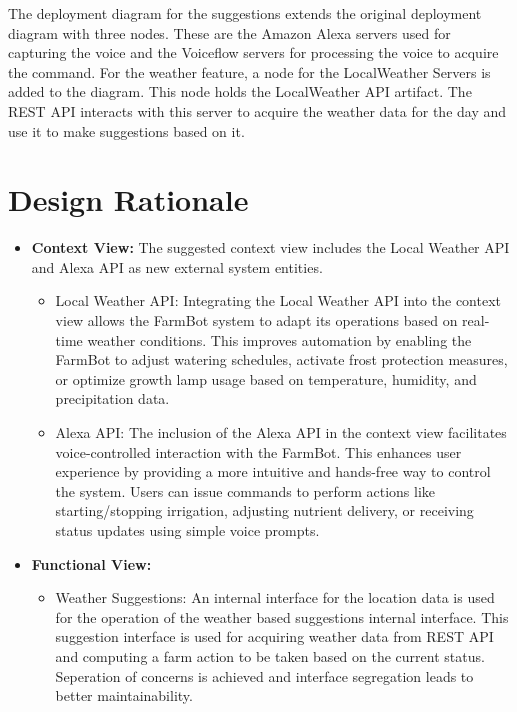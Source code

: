The deployment diagram for the suggestions extends the original deployment diagram with three nodes. These are the Amazon Alexa servers used for capturing the voice and the Voiceflow servers for processing the voice to acquire the command. For the weather feature, a node for the LocalWeather Servers is added to the diagram. This node holds the LocalWeather API artifact. The REST API interacts with this server to acquire the weather data for the day and use it to make suggestions based on it. 

\section{Design Rationale}
\begin{itemize}
    \item \textbf{Context View:} The suggested context view includes the Local Weather API and Alexa API as new external system entities.
          \begin{itemize}
              \item Local Weather API: Integrating the Local Weather API into the context view allows the FarmBot system to adapt its operations based on real-time weather conditions. This improves automation by enabling the FarmBot to adjust watering schedules, activate frost protection measures, or optimize growth lamp usage based on temperature, humidity, and precipitation data.
              \item Alexa API: The inclusion of the Alexa API in the context view facilitates voice-controlled interaction with the FarmBot. This enhances user experience by providing a more intuitive and hands-free way to control the system. Users can issue commands to perform actions like starting/stopping irrigation, adjusting nutrient delivery, or receiving status updates using simple voice prompts.
          \end{itemize}
    \item \textbf{Functional View:} \begin{itemize}
        \item Weather Suggestions: An internal interface for the location data is used for the operation of the weather based suggestions internal interface. This suggestion interface is used for acquiring weather data from REST API and computing a farm action to be taken based on the current status. Seperation of concerns is achieved and interface segregation leads to better maintainability.

\end{itemize}
\end{itemize}
